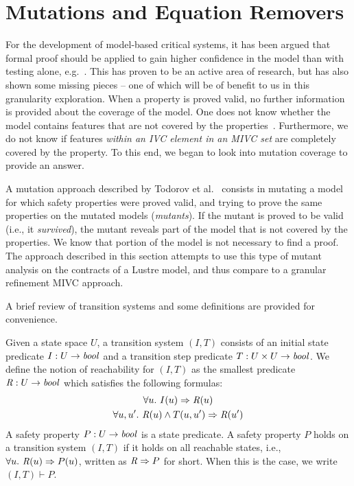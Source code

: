 \section{Mutations and Equation Removers}
\label{sec:granularityMutationEq}
For the development of model-based critical systems, it has been argued that formal proof should be applied to gain higher confidence in the model than with testing alone, e.g.~\cite{hardin2009development,miller2010software,rushby2009software,bozzano2003improving}. This has proven to be an active area of research, but has also shown some missing pieces -- one of which will be of benefit to us in this granularity exploration. When a property is proved valid, no further information is provided about the coverage of the model. One does not know whether the model contains features that are not covered by the properties~\cite{NFM2020Todorov}. Furthermore, we do not know if features \emph{within an IVC element in an MIVC set} are completely covered by the property. To this end, we began to look into mutation coverage to provide an answer. 

A mutation approach described by Todorov et al.~\cite{NFM2020Todorov} consists in mutating a model for which safety properties were proved valid, and trying to prove the same properties on the mutated models (\emph{mutants}). If the mutant is proved to be valid (i.e., it \emph{survived}), the mutant reveals part of the model that is not covered by the properties. We know that portion of the model is not necessary to find a proof. The approach described in this section attempts to use this type of mutant analysis on the contracts of a Lustre model, and thus compare to a granular refinement MIVC approach. 

A brief review of transition systems and some definitions are provided for convenience. 

Given a state space $U$, a transition system $(I,T)$ consists of an
initial state predicate $I : U \to \mathit{bool}$ and a transition step
predicate $T : U \times U \to \mathit{bool}$.
We define the notion of
reachability for $(I, T)$ as the smallest predicate $\mathit{R} : U \to
\mathit{bool}$ which satisfies the following formulas:
\begin{gather*}
  \forall u.~ I(u) \Rightarrow \mathit{R}(u) \\
  \forall u, u'.~ \mathit{R}(u) \land T(u, u') \Rightarrow \mathit{R}(u')
\end{gather*}
A safety property $P : U \to \mathit{bool}$ is a state predicate. A safety
property $P$ holds on a transition system $(I, T)$ if it holds on all
reachable states, i.e., $\forall u.~ \mathit{R}(u) \Rightarrow P(u)$,
written as $\mathit{R} \Rightarrow P$ for short. When this is the case, we
write $(I, T)\vdash P$.

